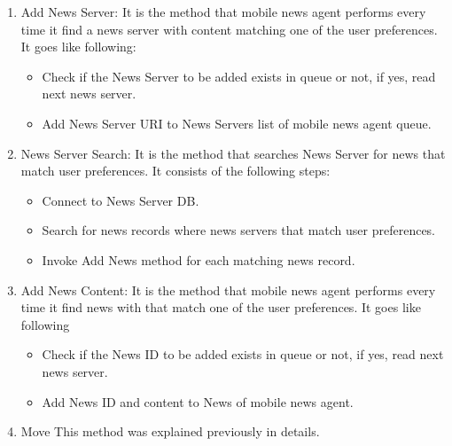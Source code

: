 \documentclass[12pt,a4paper,final,twoside,onecolumn,titlepage]{book}
\begin{document}
\begin{enumerate}
\begin{itemize}
\end{itemize}
\item Add News Server: It is the method that mobile news agent performs every time it find a news server with content matching one of the user preferences. It goes like following:
\begin{itemize}
\item Check if the News Server to be added exists in queue or not, if yes, read next news server.
\item Add News Server URI to News Servers list of mobile news agent queue.
\end{itemize}
\item News Server Search: It is the method that searches News Server for news that match user preferences. It consists of the following steps:
\begin{itemize}
\item Connect to News Server \gls{DB}.
\item Search for news records where news servers that match user preferences.
\item Invoke Add News method for each matching news record.
\end{itemize}
\item Add News Content: It is the method that mobile news agent performs every time it find news with that match one of the user preferences. It goes like following
\begin{itemize}
\item Check if the News ID to be added exists in queue or not, if yes, read next news server.
\item Add News ID and content to News of mobile news agent.
\end{itemize}
\item Move 
This method was explained previously in details.
\end{enumerate}
\end{document}

